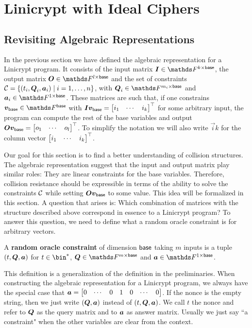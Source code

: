 \chapter{Linicrypt with Ideal Ciphers}

\section{Revisiting Algebraic Representations}
In the previous section we have defined the algebraic representation for a Linicrypt program.
It consists of the input matrix $\Inp \in \F^{k \times \base}$,
the output matrix $\O \in \F^{l \times \base}$
and the set of constraints $\mathcal{C} = \{ (t_i, \boldsymbol{Q}_i, \boldsymbol a_i) \mid i = 1, \dots, n \}$,
with $\Q_i \in \F^{m_i \times \base}$ and $\va_i \in \F^{1 \times \base}$.
These matrices are such that,
if one constrains $\vbase \in \Fsp$ with $\boldsymbol{I}\boldsymbol v_{\mathsf{base}} = \begin{bmatrix}i_1 & \cdots & i_k\end{bmatrix}^\top$ for some arbitrary input,
the program can compute the rest of the base variables and output $\boldsymbol{O} \boldsymbol v_{\mathsf{base}} = \begin{bmatrix}o_1 & \cdots & o_l\end{bmatrix}^\top$.
To simplify the notation we will also write $\vec i k$ for the column vector $\begin{bmatrix}i_1 & \cdots & i_k\end{bmatrix}^\top$.

Our goal for this section is to find a better understanding of collision structures.
The algebraic representation suggest
that the input and output matrix play similar roles:
They are linear constraints for the base variables. 
Therefore, collision resistance should be expressible in terms of the ability to solve the constraints $\mathcal{C}$ while setting $\boldsymbol{O}\boldsymbol v_{\mathsf{base}}$ to some value.  
This idea will be formalized in this section.
A question that arises is:
Which combination of matrices with the structure described above correspond in essence to a Linicrypt program?
To answer this question,
we need to define what a random oracle constraint is for arbitrary vectors.

\begin{defn}
A \textbf{random oracle constraint} of dimension $\mathsf{base}$ taking $m$ inputs is a tuple $(t, \boldsymbol Q, \boldsymbol a)$ for
$t \in \bin^*$, $\Q \in \F^{m \times \base}$ and $\va \in \F^{1 \times \base}$.
\end{defn}

This definition is a generalization of the definition in the preliminaries.
When constructing the algebraic representation for a Linicrypt program,
we always have the special case that $\boldsymbol a = \begin{bmatrix}0&\cdots&0&1&0&\cdots&0\end{bmatrix}$.
If the nonce is the empty string, then we just write $(\boldsymbol{Q}, \boldsymbol a)$ instead of $(t, \boldsymbol{Q}, \boldsymbol a)$.
We call $t$ the nonce and refer to $\boldsymbol{Q}$ as the query matrix and to $\boldsymbol a$ as answer matrix.
Usually we just say ``a constraint" when the other variables are clear from the context.

